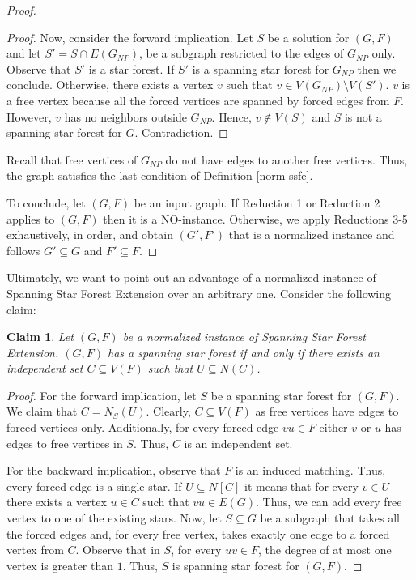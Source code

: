 \documentclass[en]{pracamgr}
\newtheorem{claim}{Claim}
\theoremstyle{definition}
\newcommand{\ssf}{spanning star forest}
\newcommand{\ssfep}{{\sc Spanning Star Forest Extension}}
\begin{document}
\begin{proof}
\begin{proof}
		Now, consider the forward implication. Let $S$ be a solution for $(G, F)$ and let $S' = S \cap E(G_{NP})$, be a subgraph restricted to the edges of $G_{NP}$ only. Observe that $S'$ is a star forest. If $S'$ is a spanning star forest for $G_{NP}$ then we conclude. Otherwise, there exists a vertex $v$ such that $v \in V(G_{NP}) \setminus V(S')$. $v$ is a free vertex because all the forced vertices are spanned by forced edges from $F$. However, $v$ has no neighbors outside $G_{NP}$. Hence, $v \notin V(S)$ and $S$ is not a spanning star forest for $G$. Contradiction.
	\end{proof}

	Recall that free vertices of $G_{NP}$ do not have edges to another free vertices. Thus, the graph satisfies the last condition of Definition \ref{norm-ssfe}.

	To conclude, let $(G,F)$ be an input graph. If Reduction 1 or Reduction 2 applies to $(G,F)$ then it is a NO-instance. Otherwise, we apply Reductions 3-5 exhaustively, in order, and obtain $(G',F')$ that is a normalized instance and follows $G' \subseteq G$ and $F' \subseteq F$.

\end{proof}

Ultimately, we want to point out an advantage of a normalized instance of \ssfep{} over an arbitrary one. Consider the following claim:

\begin{claim}\label{span-lemma}
	Let $(G,F)$ be a normalized instance of \ssfep{}. $(G,F)$ has a \ssf{} if and only if there exists an independent set $C \subseteq V(F)$ such that $U \subseteq N(C)$.
\end{claim}

\begin{proof}
	For the forward implication, let $S$ be a \ssf{} for $(G,F)$. We claim that $C=N_S(U)$. Clearly, $C \subseteq V(F)$ as free vertices have edges to forced vertices only. Additionally, for every forced edge $vu \in F$ either $v$ or $u$ has edges to free vertices in $S$. Thus, $C$ is an independent set. 
	
	For the backward implication, observe that $F$ is an induced matching. Thus, every forced edge is a single star. If $U \subseteq N[C]$ it means that for every $v \in U$ there exists a vertex $u \in C$ such that $vu \in E(G)$. Thus, we can add every free vertex to one of the existing stars. Now, let $S \subseteq G$ be a subgraph that takes all the forced edges and, for every free vertex, takes exactly one edge to a forced vertex from $C$. Observe that in $S$, for every $uv \in F$, the degree of at most one vertex is greater than $1$. Thus, $S$ is spanning star forest for $(G,F)$.
\end{proof}
\end{document}
